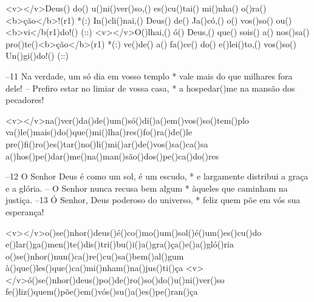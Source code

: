 <v></v>Deus() do() u()ni()ver()so,() es()cu()tai() mi()nha() o()ra()<b>ção</b>!(r1) *(:)
In()cli()nai,() Deus() de() Ja()có,() o() vos()so() ou()<b>vi</b(r1)do!() (::)
<v></v>O()lhai,() ó() Deus,() que() sois() a() nos()sa() pro()te()<b>ção</b>(r1) *(:)
ve()de() a() fa()ce() do() e()lei()to,() vos()so() Un()gi()do!() (::)

–11 Na verdade, um só dia em vosso templo * 
vale mais do que milhares fora dele!
– Prefiro estar no limiar de vossa casa, * 
a hospedar()me na mansão dos pecadores!

<v></v>na()ver()da()de()um()só()di()a()em()vos()so()tem()plo
va()le()mais()do()que()mi()lha()res()fo()ra()de()le
pre()fi()ro()es()tar()no()li()mi()ar()de()vos()sa()ca()sa
a()hos()pe()dar()me()na()man()são()dos()pe()ca()do()res
 

–12 O Senhor Deus é como um sol, é um escudo, * 
e largamente distribui a graça e a glória.
– O Senhor nunca recusa bem algum * 
àqueles que caminham na justiça. 
–13 Ó Senhor, Deus poderoso do universo, * 
feliz quem põe em vós sua esperança!

<v></v>o()se()nhor()deus()é()co()mo()um()sol()é()um()es()cu()do
e()lar()ga()men()te()dis()tri()bu()i()a()gra()ça()e()a()gló()ria
o()se()nhor()nun()ca()re()cu()sa()bem()al()gum
à()que()les()que()ca()mi()nham()na()jus()ti()ça
<v></v>ó()se()nhor()deus()po()de()ro()so()do()u()ni()ver()so
fe()liz()quem()põe()em()vós()su()a()es()pe()ran()ça